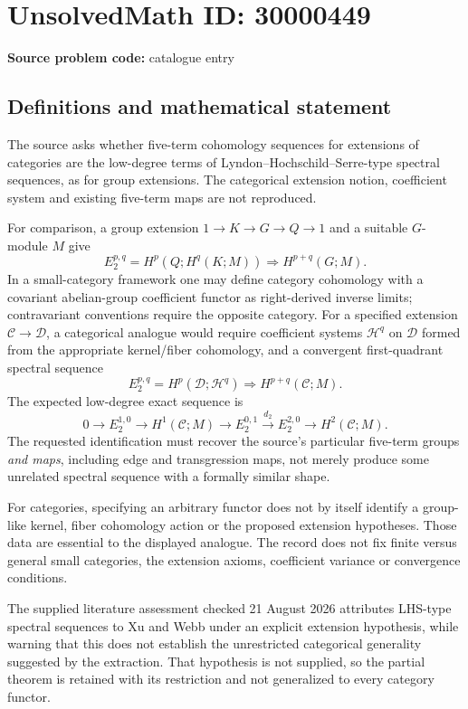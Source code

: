 \documentclass[11pt]{article}
\begin{document}
\section*{UnsolvedMath ID: 30000449}
\textbf{Source problem code:} catalogue entry
\subsection{Definitions and mathematical statement}
The source asks whether five-term cohomology sequences for extensions of categories are the low-degree terms of Lyndon--Hochschild--Serre-type spectral sequences, as for group extensions. The categorical extension notion, coefficient system and existing five-term maps are not reproduced.

For comparison, a group extension $1\to K\to G\to Q\to1$ and a suitable $G$-module $M$ give
\[
 E_2^{p,q}=H^p(Q;H^q(K;M))\Longrightarrow H^{p+q}(G;M).
\]
In a small-category framework one may define category cohomology with a covariant abelian-group coefficient functor as right-derived inverse limits; contravariant conventions require the opposite category. For a specified extension $\mathcal C\to\mathcal D$, a categorical analogue would require coefficient systems $\mathcal H^q$ on $\mathcal D$ formed from the appropriate kernel/fiber cohomology, and a convergent first-quadrant spectral sequence
\[
 E_2^{p,q}=H^p(\mathcal D;\mathcal H^q)
                  \Longrightarrow H^{p+q}(\mathcal C;M).
\]
The expected low-degree exact sequence is
\[
 0\longrightarrow E_2^{1,0}\longrightarrow H^1(\mathcal C;M)
 \longrightarrow E_2^{0,1}\xrightarrow{\ d_2\ }E_2^{2,0}
 \longrightarrow H^2(\mathcal C;M).
\]
The requested identification must recover the source's particular five-term groups \emph{and maps}, including edge and transgression maps, not merely produce some unrelated spectral sequence with a formally similar shape.

For categories, specifying an arbitrary functor does not by itself identify a group-like kernel, fiber cohomology action or the proposed extension hypotheses. Those data are essential to the displayed analogue. The record does not fix finite versus general small categories, the extension axioms, coefficient variance or convergence conditions.

The supplied literature assessment checked 21 August 2026 attributes LHS-type spectral sequences to Xu and Webb under an explicit extension hypothesis, while warning that this does not establish the unrestricted categorical generality suggested by the extraction. That hypothesis is not supplied, so the partial theorem is retained with its restriction and not generalized to every category functor.
\end{document}
